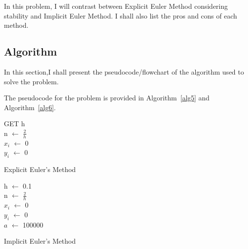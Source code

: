 \documentclass[titlepage, 11pt]{article}
\begin{document}
In this problem, I will contrast between Explicit Euler Method considering stability and Implicit Euler Method. I shall also list the pros and cons of each method.

\subsection{Algorithm}
In this section,I shall present the pseudocode/flowchart of the algorithm used to solve the problem.

The pseudocode for the problem is provided in Algorithm~\ref{alg5} and Algorithm~\ref{alg6}.
\begin{center}
\begin{algorithm}[H]\label{alg5}

\SetAlgoLined

GET h \\
n $\gets$ $\frac{2}{h}$ \\
$x_i$ $\gets$ 0\\
$y_i$ $\gets$ 0\\

 \caption{Explicit Euler's Method}
\end{algorithm}    
\end{center}

\begin{center}
\begin{algorithm}[H]\label{alg6}

\SetAlgoLined

h $\gets$ 0.1 \\
n $\gets$ $\frac{2}{h}$ \\
$x_i$ $\gets$ 0\\
$y_i$ $\gets$ 0\\
$a$ $\gets$ 100000 \\

 \caption{Implicit Euler's Method}
\end{algorithm}    
\end{center}
\end{document}
